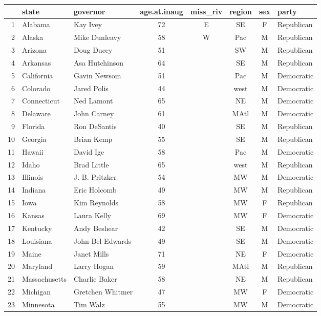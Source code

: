 \documentclass[11pt]{article}
\begin{document}
\begin{table}[ht]
\centering
\begin{tabular}{rll c   | c |  ccl}
  \hline
 & state & governor & age.at.inaug & miss\_riv & region & sex & party \\ 
  \hline
1 & Alabama & Kay Ivey & 72 & ~E~ & SE & F & Republican \\ 
  2 & Alaska & Mike Dunleavy & 58 & W & Pac & M & Republican \\ 
  3 & Arizona & Doug Ducey & 51 &  & SW & M & Republican \\ 
  4 & Arkansas & Asa Hutchinson & 64 &  & SE & M & Republican \\ 
  5 & California & Gavin Newsom & 51 &  & Pac & M & Democratic \\ 
  6 & Colorado & Jared Polis & 44 &  & west & M & Democratic \\ 
  7 & Connecticut & Ned Lamont & 65 &  & NE & M & Democratic \\ 
  8 & Delaware & John Carney & 61 &  & MAtl & M & Democratic \\ 
  9 & Florida & Ron DeSantis & 40 &  & SE & M & Republican \\ 
  10 & Georgia & Brian Kemp & 55 &  & SE & M & Republican \\ 
  11 & Hawaii & David Ige & 58 &  & Pac & M & Democratic \\ 
  12 & Idaho & Brad Little & 65 &  & west & M & Republican \\ 
  13 & Illinois & J. B. Pritzker & 54 &  & MW & M & Democratic \\ 
  14 & Indiana & Eric Holcomb & 49 &  & MW & M & Republican \\ 
  15 & Iowa & Kim Reynolds & 58 &  & MW & F & Republican \\ 
  16 & Kansas & Laura Kelly & 69 &  & MW & F & Democratic \\ 
  17 & Kentucky & Andy Beshear & 42 &  & SE & M & Democratic \\ 
  18 & Louisiana & John Bel Edwards & 49 &  & SE & M & Democratic \\ 
  19 & Maine & Janet Mills & 71 &  & NE & F & Democratic \\ 
  20 & Maryland & Larry Hogan & 59 &  & MAtl & M & Republican \\ 
  21 & Massachusetts & Charlie Baker & 58 &  & NE & M & Republican \\ 
  22 & Michigan & Gretchen Whitmer & 47 &  & MW & F & Democratic \\ 
  23 & Minnesota & Tim Walz & 55 &  & MW & M & Democratic \\ 

\end{tabular}
\end{table}
\end{document}
